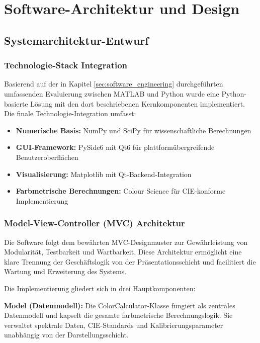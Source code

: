 \chapter{Software-Architektur und Design}

\section{Systemarchitektur-Entwurf}

\subsection{Technologie-Stack Integration}

Basierend auf der in Kapitel \ref{sec:software_engineering} durchgeführten umfassenden Evaluierung zwischen MATLAB und Python wurde eine Python-basierte Lösung mit den dort beschriebenen Kernkomponenten implementiert. Die finale Technologie-Integration umfasst:

\begin{itemize}
    \item \textbf{Numerische Basis:} NumPy \parencite{NumPy} und SciPy \parencite{SciPy} für wissenschaftliche Berechnungen
    \item \textbf{GUI-Framework:} PySide6 \parencite{PySide6} mit Qt6 \parencite{Qt6} für plattformübergreifende Benutzeroberflächen
    \item \textbf{Visualisierung:} Matplotlib \parencite{Matplotlib} mit Qt-Backend-Integration
    \item \textbf{Farbmetrische Berechnungen:} Colour Science \parencite{ColourScience} für CIE-konforme Implementierung
\end{itemize}

\subsection{Model-View-Controller (MVC) Architektur}

Die Software folgt dem bewährten MVC-Designmuster zur Gewährleistung von Modularität, Testbarkeit und Wartbarkeit. Diese Architektur ermöglicht eine klare Trennung der Geschäftslogik von der Präsentationsschicht und facilitiert die Wartung und Erweiterung des Systems.

Die Implementierung gliedert sich in drei Hauptkomponenten:

\textbf{Model (Datenmodell):} Die ColorCalculator-Klasse fungiert als zentrales Datenmodell und kapselt die gesamte farbmetrische Berechnungslogik. Sie verwaltet spektrale Daten, CIE-Standards und Kalibrierungsparameter unabhängig von der Darstellungsschicht.

